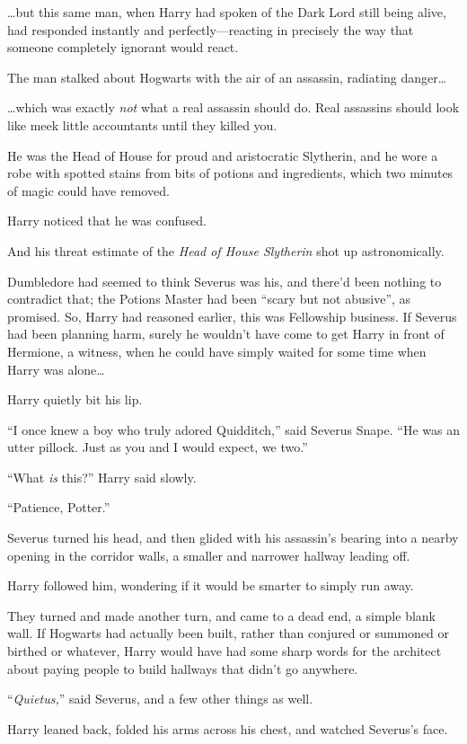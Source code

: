 …but this same man, when Harry had spoken of the Dark Lord still being
alive, had responded instantly and perfectly—reacting in precisely the way
that someone completely ignorant would react.

The man stalked about Hogwarts with the air of an assassin, radiating
danger…

…which was exactly \emph{not} what a real assassin should do. Real
assassins should look like meek little accountants until they killed you.

He was the Head of House for proud and aristocratic Slytherin, and he wore a
robe with spotted stains from bits of potions and ingredients, which two
minutes of magic could have removed.

Harry noticed that he was confused.

And his threat estimate of the \emph{Head of House Slytherin} shot up
astronomically.

Dumbledore had seemed to think Severus was his, and there’d been nothing to
contradict that; the Potions Master had been “scary but not abusive”, as
promised. So, Harry had reasoned earlier, this was Fellowship business. If
Severus had been planning harm, surely he wouldn’t have come to get Harry in
front of Hermione, a witness, when he could have simply waited for some time
when Harry was alone…

Harry quietly bit his lip.

“I once knew a boy who truly adored Quidditch,” said Severus Snape. “He was an
utter pillock. Just as you and I would expect, we two.”

“What \emph{is} this?” Harry said slowly.

“Patience, Potter.”

Severus turned his head, and then glided with his assassin’s bearing into a
nearby opening in the corridor walls, a smaller and narrower hallway leading
off.

Harry followed him, wondering if it would be smarter to simply run away.

They turned and made another turn, and came to a dead end, a simple blank wall.
If Hogwarts had actually been built, rather than conjured or summoned or
birthed or whatever, Harry would have had some sharp words for the architect
about paying people to build hallways that didn’t go anywhere.

“\emph{Quietus,}” said Severus, and a few other things as well.

Harry leaned back, folded his arms across his chest, and watched Severus’s face.

